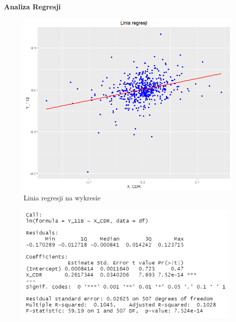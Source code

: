 \documentclass[a4paper,11pt]{article}
\begin{document}
\newpage
\textbf{Analiza Regresji}

\begin{figure}[H]
    \includegraphics[width=12cm]{Wykresy/Prosta regresji.png}
    \caption{Linia regresji na  wykresie}
    \label{Wykres_regresji}
\end{figure}


\begin{figure}[H]
    \includegraphics[width=11cm]{Wykresy/Analiza.png}
\end{figure}
\end{document}
